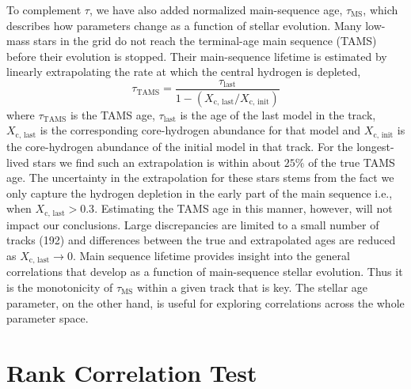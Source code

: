 To complement $\tau$, we have also added normalized main-sequence age, $\tau_{\text{MS}}$, which describes how parameters change as a function of stellar evolution. 
Many low-mass stars in the grid do not reach the terminal-age main sequence (TAMS) before their evolution is stopped. 
Their main-sequence lifetime is estimated by linearly extrapolating the rate at which the central hydrogen is depleted,
\begin{equation}
\tau_{\text{TAMS}} =  \frac{\tau_{\text{last}}}{1-(X_{\text{c, last}}/X_{\text{c, init}})}
\end{equation}
where $\tau_{\text{TAMS}}$ is the TAMS age,  $\tau_{\text{last}}$ is the age of the last model in  the track,  $X_{\text{c, last}}$ is the corresponding core-hydrogen abundance for that model and $X_{\text{c, init}}$ is the core-hydrogen abundance of the initial model in that track. 
For the longest-lived stars we find such an extrapolation is within about  $25\%$ of the true TAMS age. The uncertainty in the extrapolation for these stars stems from the fact we only capture the hydrogen depletion in the early part of the main sequence i.e., when  ${X_{\text{c, last}} > 0.3}$.  Estimating the TAMS age in this manner, however,  will not impact our conclusions.
Large discrepancies are limited to a small number of tracks (192) and differences between the true and extrapolated ages are reduced as ${X_{\text{c, last}} \to 0}$. 
Main sequence lifetime  provides insight into the general correlations that develop as a function of main-sequence stellar evolution. Thus it is the monotonicity of $\tau_{\text{MS}}$ within a given track that is key.  The stellar age parameter, on the other hand, is useful for exploring correlations across the whole parameter space. 


\section{Rank Correlation Test}
\label{sec:RCT}


